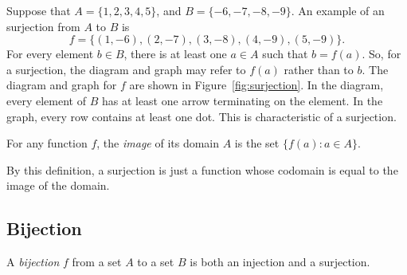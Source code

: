 \noindent Suppose that $A = \{1, 2, 3, 4, 5\}$, and $B = \{-6, -7, -8, -9\}$.
An example of an surjection from $A$ to $B$ is
\begin{equation*}
   f = \{(1,-6), (2,-7), (3,-8), (4,-9), (5,-9)\}.
\end{equation*}
For every element $b \in B$, there is at least one $a \in A$ such that $b =
f(a)$.  So, for a surjection, the diagram and graph may refer to $f(a)$ rather
than to $b$. The diagram and graph for $f$ are shown in
Figure~\ref{fig:surjection}.  In the diagram, every element of $B$ has at least
one arrow terminating on the element. In the graph, every row contains at least
one dot.  This is characteristic of a surjection.

\begin{definition}
   For any function $f$, the \emph{image} of its domain $A$ is the set $\{f(a)
   : a \in A\}$.
\end{definition}

\noindent By this definition, a surjection is just a function whose codomain is
equal to the image of the domain.

\subsection{Bijection}

\begin{definition}
   A \emph{bijection} $f$ from a set $A$ to a set $B$ is both an injection and
   a surjection.
\end{definition}

